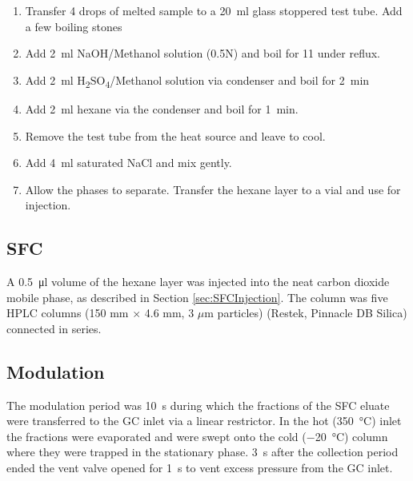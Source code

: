 \begin{enumerate}
  
\item Transfer \num{4} drops of melted sample to a \SI{20}{\milli\litre} glass
stoppered test tube. Add a few boiling stones

\item Add \SI{2}{\milli\litre} NaOH/Methanol solution (0.5N) and boil for
\SI{11}{\min} under reflux.

\item Add \SI{2}{\milli\litre} H\textsubscript{2}SO\textsubscript{4}/Methanol
solution via condenser and boil for \SI{2}{\minute}

\item  Add \SI{2}{\milli\litre} hexane via the condenser and boil for
\SI{1}{\minute}.

\item Remove the test tube from the heat source and leave to cool.

\item Add \SI{4}{\milli\litre} saturated NaCl and mix gently.

\item Allow the phases to separate. Transfer the hexane layer to a vial and use for injection.

\end{enumerate}

\subsection{SFC}

A \SI{0.5}{\micro\litre} volume of the hexane layer was injected into the neat
carbon dioxide mobile phase, as described in Section \ref{sec:SFCInjection}. The
column was five HPLC columns (150 mm $\times$ 4.6 mm, 3 $\mu$m particles)
(Restek, Pinnacle DB Silica) connected in series.

\subsection{Modulation}

The modulation period was \SI{10}{\second} during which the fractions of the SFC
eluate were transferred to the GC inlet via a linear restrictor. In the hot
(\SI{350}{\celsius}) inlet the fractions were evaporated and were swept onto the
cold (\SI{-20}{\celsius}) column where they were trapped in the stationary phase.
\SI{3}{\second} after the collection period ended the vent valve opened for
\SI{1}{\second} to vent excess pressure from the GC inlet.

